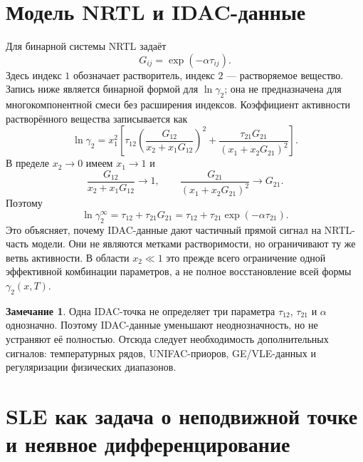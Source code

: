 \documentclass[11pt]{article}
\theoremstyle{definition}
\newtheorem{remark}{Замечание}[section]
\begin{document}
\section{Модель NRTL и IDAC-данные}
\label{app:nrtl}

Для бинарной системы NRTL задаёт~\cite{renon1968}
\begin{equation*}
    G_{ij}=\exp(-\alpha\tau_{ij}).
\end{equation*}
Здесь индекс $1$ обозначает растворитель, индекс $2$ --- растворяемое вещество. Запись ниже является бинарной формой для $\ln\gamma_2$; она не предназначена для многокомпонентной смеси без расширения индексов. Коэффициент активности растворённого вещества записывается как
\begin{equation}
\ln\gamma_2
= x_1^2\left[
\tau_{12}\left(\frac{G_{12}}{x_2+x_1G_{12}}\right)^2
+ \frac{\tau_{21}G_{21}}{(x_1+x_2G_{21})^2}
\right].
\label{eq:nrtl}
\end{equation}
В пределе $x_2\to0$ имеем $x_1\to1$ и
\begin{equation*}
    \frac{G_{12}}{x_2+x_1G_{12}}\to 1,
    \qquad
    \frac{G_{21}}{(x_1+x_2G_{21})^2}\to G_{21}.
\end{equation*}
Поэтому
\begin{equation}
    \ln\gamma_2^{\infty}=\tau_{12}+\tau_{21}G_{21}
    =\tau_{12}+\tau_{21}\exp(-\alpha\tau_{21}).
    \label{eq:idac}
\end{equation}
Это объясняет, почему IDAC-данные дают частичный прямой сигнал на NRTL-часть модели. Они не являются метками растворимости, но ограничивают ту же ветвь активности. В области $x_2\ll1$ это прежде всего ограничение одной эффективной комбинации параметров, а не полное восстановление всей формы $\gamma_2(x,T)$.

\begin{remark}
Одна IDAC-точка не определяет три параметра $\tau_{12}$, $\tau_{21}$ и $\alpha$ однозначно. Поэтому IDAC-данные уменьшают неоднозначность, но не устраняют её полностью. Отсюда следует необходимость дополнительных сигналов: температурных рядов, UNIFAC-приоров, GE/VLE-данных и регуляризации физических диапазонов.
\end{remark}


\section{SLE как задача о неподвижной точке и неявное дифференцирование}
\label{app:implicit}
\end{document}
